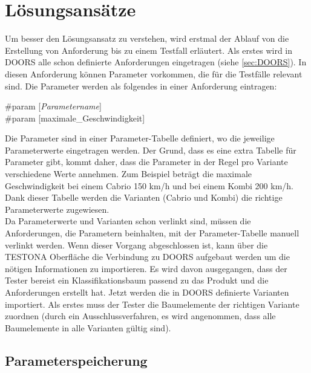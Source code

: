 \chapter{Lösungsansätze}\label{chp:loesungsansaetze}

Um besser den Lösungsansatz zu verstehen, wird erstmal der Ablauf von die Erstellung von Anforderung bis zu einem Testfall erläutert. Als erstes wird in DOORS alle schon definierte Anforderungen eingetragen (siehe \ref{sec:DOORS}). In diesen Anforderung können Parameter vorkommen, die für die Testfälle relevant sind. Die Parameter werden als folgendes in einer Anforderung eintragen:\\

\begin{center}
\#param [\textit{Parametername}]\\
\#param [maximale\_Geschwindigkeit]
\end{center}

Die Parameter sind in einer Parameter-Tabelle definiert, wo die jeweilige Parameterwerte eingetragen werden. Der Grund, dass es eine extra Tabelle für Parameter gibt, kommt daher, dass die Parameter in der Regel pro Variante verschiedene Werte annehmen. Zum Beispiel beträgt die maximale Geschwindigkeit bei einem Cabrio 150 km/h  und bei einem Kombi 200 km/h. Dank dieser Tabelle werden die Varianten (Cabrio und Kombi) die richtige Parameterwerte zugewiesen.\\

Da Parameterwerte und Varianten schon verlinkt sind, müssen die Anforderungen, die Parametern beinhalten, mit der Parameter-Tabelle manuell verlinkt werden. Wenn dieser Vorgang abgeschlossen ist, kann über die TESTONA Oberfläche die Verbindung zu DOORS aufgebaut werden um die nötigen Informationen zu importieren. Es wird davon ausgegangen, dass der Tester bereist ein Klassifikationsbaum passend zu das Produkt und die Anforderungen erstellt hat. Jetzt werden die in DOORS definierte Varianten importiert. Als erstes muss der Tester die Baumelemente der richtigen Variante zuordnen (durch ein Ausschlussverfahren, es wird angenommen, dass alle Baumelemente in alle Varianten gültig sind). 


\newpage
\section{Parameterspeicherung}
